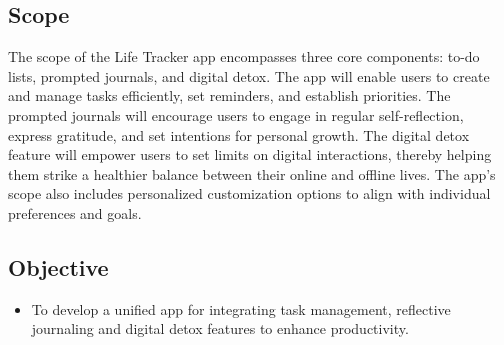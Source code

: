 \subsection{Scope}
The scope of the Life Tracker app encompasses three core components: to-do lists, prompted journals, and digital detox. The app will enable users to create and manage tasks efficiently, set reminders, and establish priorities. The prompted journals will encourage users to engage in regular self-reflection, express gratitude, and set intentions for personal growth. The digital detox feature will empower users to set limits on digital interactions, thereby helping them strike a healthier balance between their online and offline lives. The app's scope also includes personalized customization options to align with individual preferences and goals.\\

\newpage
\subsection{Objective}

\begin{itemize}
    \item To develop a unified app for integrating task management, reflective journaling and digital detox features to enhance productivity.

  
\end{itemize}
